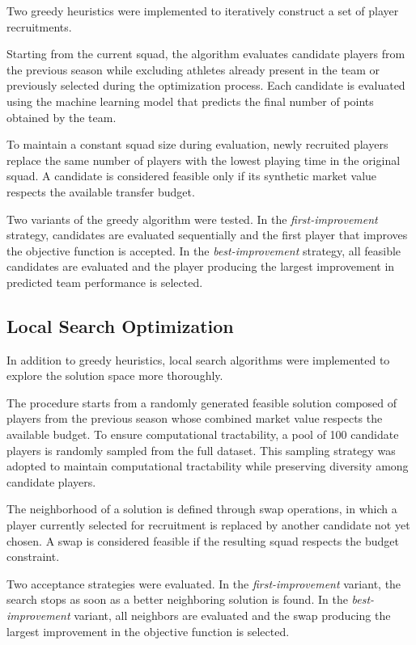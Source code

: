 \documentclass[12pt]{article}
\begin{document}
Two greedy heuristics were implemented to iteratively construct a set of player recruitments.

Starting from the current squad, the algorithm evaluates candidate players from the previous season while excluding athletes already present in the team or
previously selected during the optimization process. Each candidate is evaluated using the machine learning model that predicts the final number of points
obtained by the team.

To maintain a constant squad size during evaluation, newly recruited players replace the same number of players with the lowest playing time in the original
squad. A candidate is considered feasible only if its synthetic market value respects the available transfer budget.

Two variants of the greedy algorithm were tested. In the \textit{first-improvement} strategy, candidates are evaluated sequentially and the first player that improves
the objective function is accepted. In the \textit{best-improvement} strategy, all feasible candidates are evaluated and the player producing the largest
improvement in predicted team performance is selected.

\subsection{Local Search Optimization}

In addition to greedy heuristics, local search algorithms were implemented to explore the solution space more thoroughly.

The procedure starts from a randomly generated feasible solution composed of players from the previous season whose combined market value respects the
available budget. To ensure computational tractability, a pool of 100 candidate players is randomly sampled from the full dataset.
This sampling strategy was adopted to maintain computational tractability while preserving diversity among candidate players.

The neighborhood of a solution is defined through swap operations, in which a player currently selected for recruitment is replaced by another candidate not
yet chosen. A swap is considered feasible if the resulting squad respects the budget constraint.

Two acceptance strategies were evaluated. In the \textit{first-improvement} variant, the search stops as soon as a better neighboring solution is found.
In the \textit{best-improvement} variant, all neighbors are evaluated and the swap producing the largest improvement in the objective function is selected.
\end{document}
